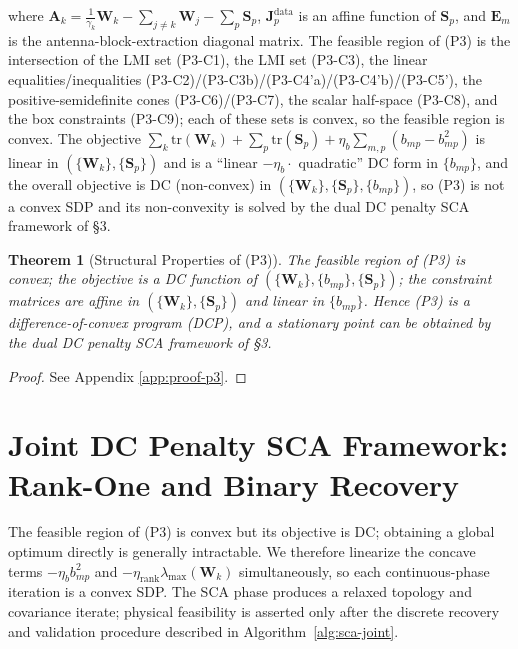 \documentclass[12pt,a4paper]{article}
\newtheorem{theorem}{Theorem}
\newcommand{\mat}[1]{\mathbf{#1}}
\newcommand{\tr}{\text{tr}}
\begin{document}
where $\mat{A}_k = \frac{1}{\gamma_k} \mat{W}_k - \sum_{j \neq k} \mat{W}_j - \sum_{p} \mat{S}_p$, $\mat{J}_p^{\text{data}}$ is an affine function of $\mat{S}_p$, and $\mat{E}_m$ is the antenna-block-extraction diagonal matrix. The feasible region of (P3) is the intersection of the LMI set (P3-C1), the LMI set (P3-C3), the linear equalities/inequalities (P3-C2)/(P3-C3b)/(P3-C4'a)/(P3-C4'b)/(P3-C5'), the positive-semidefinite cones (P3-C6)/(P3-C7), the scalar half-space (P3-C8), and the box constraints (P3-C9); each of these sets is convex, so the feasible region is convex. The objective $\sum_k \tr(\mat{W}_k) + \sum_p \tr(\mat{S}_p) + \eta_b \sum_{m,p} (b_{mp} - b_{mp}^2)$ is linear in $(\{\mat{W}_k\}, \{\mat{S}_p\})$ and is a ``linear $-\eta_b \cdot$ quadratic'' DC form in $\{b_{mp}\}$, and the overall objective is DC (non-convex) in $(\{\mat{W}_k\}, \{\mat{S}_p\}, \{b_{mp}\})$, so (P3) is not a convex SDP and its non-convexity is solved by the dual DC penalty SCA framework of \S3.

\begin{theorem}[Structural Properties of (P3)]\label{thm:p3-structure}
The feasible region of (P3) is convex; the objective is a DC function of $(\{\mat{W}_k\}, \{b_{mp}\}, \{\mat{S}_p\})$; the constraint matrices are affine in $(\{\mat{W}_k\}, \{\mat{S}_p\})$ and linear in $\{b_{mp}\}$. Hence (P3) is a difference-of-convex program (DCP), and a stationary point can be obtained by the dual DC penalty SCA framework of \S3.
\end{theorem}

\begin{proof}
See Appendix \ref{app:proof-p3}.
\end{proof}

\section{Joint DC Penalty SCA Framework: Rank-One and Binary Recovery}\label{sec:sca}

The feasible region of (P3) is convex but its objective is DC; obtaining a global optimum directly is generally intractable. We therefore linearize the concave terms $-\eta_b b_{mp}^2$ and $-\eta_{\text{rank}}\lambda_{\max}(\mat{W}_k)$ simultaneously, so each continuous-phase iteration is a convex SDP. The SCA phase produces a relaxed topology and covariance iterate; physical feasibility is asserted only after the discrete recovery and validation procedure described in Algorithm~\ref{alg:sca-joint}.
\end{document}
